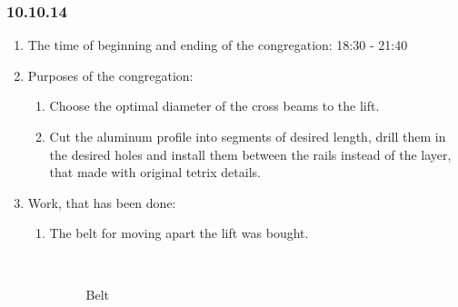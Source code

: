 
\subsubsection{10.10.14}

\begin{enumerate}
	\item The time of beginning and ending of the congregation:
	18:30 - 21:40
	\item Purposes of the congregation:
	\begin{enumerate}
	  \item Choose the optimal diameter of the cross beams to the lift.
	  
	  \item Cut the aluminum profile into segments of desired length, drill them in the desired holes and install them between the rails instead of the layer, that made with original tetrix details.
	  
    \end{enumerate}
	\item Work, that has been done:
	\begin{enumerate}
	  \item The belt for moving apart the lift was bought.
	  
	  \begin{figure}[H]
	  	\begin{minipage}[h]{0.2\linewidth}
	  		\center  
	  	\end{minipage}
	  	\begin{minipage}[h]{0.6\linewidth}
	  		\caption{Belt}
	  	\end{minipage}
	  \end{figure}
      

\end{enumerate}
\end{enumerate}
